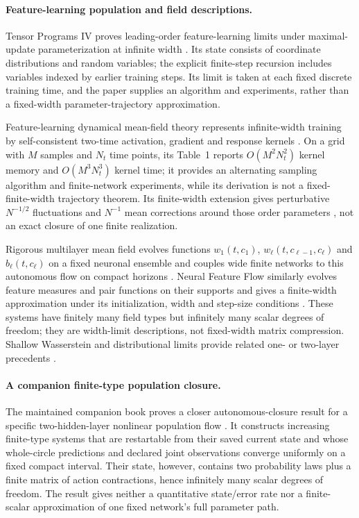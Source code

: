\documentclass[11pt]{article}
\theoremstyle{definition}
\theoremstyle{remark}
\begin{document}
\paragraph{Feature-learning population and field descriptions.}
Tensor Programs IV proves leading-order feature-learning limits under
maximal-update parameterization at infinite width
\citep{yang2021tensor}.  Its state consists of coordinate distributions and
random variables; the explicit finite-step recursion includes variables indexed
by earlier training steps.  Its limit is taken at each fixed discrete training
time, and the paper supplies an algorithm and experiments, rather than a
fixed-width parameter-trajectory approximation.

Feature-learning dynamical mean-field theory represents infinite-width training
by self-consistent two-time activation, gradient and response kernels
\citep{bordelon2022dmft}.  On a grid with $M$ samples and $N_t$ time points,
its Table~1 reports $O(M^2N_t^2)$ kernel memory and $O(M^3N_t^3)$ kernel time;
it provides an alternating sampling algorithm and finite-network experiments,
while its derivation is not a fixed-finite-width trajectory theorem.  Its
finite-width extension gives perturbative $N^{-1/2}$ fluctuations and
$N^{-1}$ mean corrections around those order parameters
\citep{bordelon2023finite}, not an exact closure of one finite realization.

Rigorous multilayer mean field evolves functions
$w_1(t,c_1)$, $w_\ell(t,c_{\ell-1},c_\ell)$ and $b_\ell(t,c_\ell)$ on a fixed
neuronal ensemble and couples wide finite networks to this autonomous flow on
compact horizons \citep{nguyen2023rigorous}.  Neural Feature Flow similarly
evolves feature measures and pair functions on their supports and gives a
finite-width approximation under its initialization, width and step-size
conditions \citep{fang2020features}.  These systems have finitely many field
types but infinitely many scalar degrees of freedom; they are width-limit
descriptions, not fixed-width matrix compression.  Shallow Wasserstein and
distributional limits provide related one- or two-layer precedents
\citep{chizat2018global,sirignano2019lln,mei2018meanfield}.

\paragraph{A companion finite-type population closure.}
The maintained companion book proves a closer autonomous-closure result for a
specific two-hidden-layer nonlinear population flow
\citep{pde2026observable}.  It constructs increasing finite-type systems that
are restartable from their saved current state and whose whole-circle
predictions and declared joint observations converge uniformly on a fixed
compact interval.  Their state, however, contains two probability laws plus a
finite matrix of action contractions, hence infinitely many scalar degrees of
freedom.  The result gives neither a quantitative state/error rate nor a
finite-scalar approximation of one fixed network's full parameter path.
\end{document}
